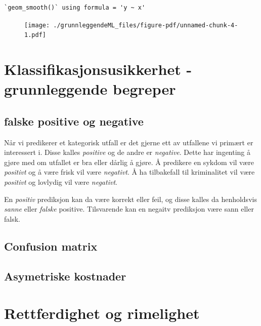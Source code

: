 \documentclass[
  letterpaper,
  DIV=11,
  numbers=noendperiod]{scrreprt}
\theoremstyle{definition}
\theoremstyle{remark}
\begin{document}
\begin{verbatim}
`geom_smooth()` using formula = 'y ~ x'
\end{verbatim}

\begin{figure}[H]

{\centering \texttt{[image: ./grunnleggendeML\_files/figure-pdf/unnamed-chunk-4-1.pdf]}

}

\end{figure}

\hypertarget{klassifikasjonsusikkerhet---grunnleggende-begreper}{%
\section{Klassifikasjonsusikkerhet - grunnleggende
begreper}\label{klassifikasjonsusikkerhet---grunnleggende-begreper}}

\hypertarget{falske-positive-og-negative}{%
\subsection{falske positive og
negative}\label{falske-positive-og-negative}}

Når vi predikerer et kategorisk utfall er det gjerne ett av utfallene vi
primært er interessert i. Disse kalles \emph{positive} og de andre er
\emph{negative}. Dette har ingenting å gjøre med om utfallet er bra
eller dårlig å gjøre. Å predikere en sykdom vil være \emph{positivt} og
å være frisk vil være \emph{negativt}. Å ha tilbakefall til kriminalitet
vil være \emph{positivt} og lovlydig vil være \emph{negativt}.

En \emph{positiv} prediksjon kan da være korrekt eller feil, og disse
kalles da henholdsvis \emph{sanne} eller \emph{falske} positive.
Tilsvarende kan en negaitv prediksjon være sann eller falsk.

\hypertarget{confusion-matrix}{%
\subsection{Confusion matrix}\label{confusion-matrix}}

\hypertarget{asymetriske-kostnader}{%
\subsection{Asymetriske kostnader}\label{asymetriske-kostnader}}

\hypertarget{rettferdighet-og-rimelighet}{%
\section{Rettferdighet og
rimelighet}\label{rettferdighet-og-rimelighet}}
\end{document}
